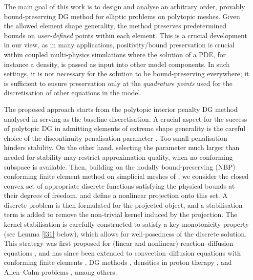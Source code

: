 \documentclass[11pt,final]{amsart}
\theoremstyle{plain}
\theoremstyle{definition}
\begin{document}
The main goal of this work is to design and analyse an arbitrary order, provably
bound-preserving DG method for elliptic problems on polytopic
meshes. Given the allowed element shape generality, the method preserves predetermined bounds on \emph{user-defined} points within each element.  This is a crucial development in our view, as in many applications, positivity/bound preservation is  crucial within coupled multi-physics simulations where the
solution of a PDE, for instance a density, is passed as input into other model
components. In such settings, it is not necessary for the solution to
be bound-preserving everywhere; it is sufficient to ensure preservation only at the
\emph{quadrature points} used for the discretisation of other equations in the model.  




The proposed approach starts from the polytopic interior penalty DG
method analysed in \cite{cangiani2014hp, cangiani2017hp} serving as the baseline discretisation. A crucial aspect for the success of polytopic DG in admitting elements of extreme shape generality is the careful choice of the discontinuity-penalisation parameter \cite{cangiani2014hp, cangiani2017hp}. Too small penalisation hinders stability. On the other hand, selecting the parameter much larger than needed for stability may restrict approximation quality, when no conforming subspace is available. Then, building on the nodally bound-preserving (NBP) conforming finite element method on simplicial meshes of \cite{BGPV24}, we consider the closed convex set of appropriate discrete functions satisfying the physical bounds at their degrees of
freedom, and define a nonlinear projection onto this set. A discrete problem is
then formulated for the projected object, and a stabilisation term is
added to remove the non-trivial kernel induced by the projection.  The kernel stabilisation is carefully constructed to satisfy a key monotonicity property (see Lemma \ref{l31} below), which allows for well-posedness of the discrete solution. This
strategy was first proposed for (linear
and nonlinear)  reaction--diffusion equations  \cite{BGPV24}, and has since been extended to convection--diffusion
equations with conforming finite elements \cite{ABP24}, DG methods
\cite{barrenechea2025nodally}, densities in proton therapy
\cite{ashby2025positivity}, and Allen--Cahn problems \cite{DEW25},
among others.
\end{document}
